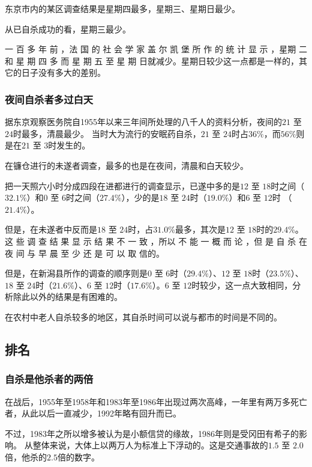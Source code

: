 \documentclass[UTF8]{ctexart}
\begin{document}
东京市内的某区调查结果是星期四最多，星期三、星期日最少。

从已自杀成功的看，星期三最少。

一 百 多 年 前 ，法 国 的 社 会 学 家 盖 尔 凯 堡 所 作 的 统 计 显 示 ，星期 二 和 星 期 四 多 而 星 期 五 至 星 期 日就减少。星期日较少这一点都是一样的，其它的日子没有多大的差别。

\subsubsection*{夜间自杀者多过白天}

据东京观察医务院自1955年以来三年间所处理的八千人的资料分析，夜间的$21$ 至 $24$时最多，清晨最少。
当时大为流行的安眠药自杀，$21$ 至 $24$时占$36\%$，而$56\%$则是在$21$ 至 $3$时发生的。

在镰仓进行的未遂者调查，最多的也是在夜间，清晨和白天较少。

把一天照六小时分成四段在进都进行的调查显示，已遂中多的是$12$ 至 $18$时之间（$32.1\%$）和$0$ 至 $6$时之间（$27.4\%$），少的是$18$ 至 $24$时（$19.0\%$）和$6$ 至 $12$时 （$21.4\%$）。

但是，在未遂者中反而是$18$ 至 $24$时，占$31.0\%$最多，其次是$12$ 至 $18$时的$29.4\%$。 这 些 调 查 结 果 显 示 结 果 不 一 致 ，所以 不 能 一 概 而 论 ，但 是 自 杀 在 夜 间 与 早 晨 至 少 还 是 可 以 取 信的。

但是，在新潟县所作的调查的顺序则是$0$ 至 $6$时（$29.4\%$）、$12$ 至 $18$时（$23.5\%$）、$18$ 至 $24$时（$21.6\%$）、$6$ 至 $12$时（$17.6\%$）。$6$ 至 $12$时较少，这一点大致相同，分析除此以外的结果是有困难的。

在农村中老人自杀较多的地区，其自杀时间可以说与都市的时间是不同的。

\subsection{排名}

\subsubsection*{自杀是他杀者的两倍}

在战后，1955年至1958年和1983年至1986年出现过两次高峰，一年里有两万多死亡者，从此以后一直减少，1992年略有回升而已。

不过，1983年之所以增多被认为是小额信贷的缘故，1986年则是受冈田有希子的影响。
从整体来说，大体上以两万人为标准上下浮动的。这是交通事故的$1.5$ 至 $2.0$倍，他杀的$2.5$倍的数字。
\end{document}
